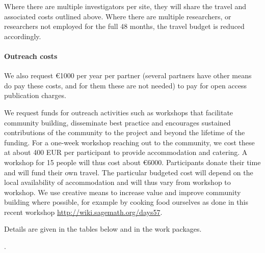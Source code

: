Where there are multiple investigators per site, they will share the
travel and associated costs outlined above. Where there are multiple
researchers, or researchers not employed for the full 48 months, the
travel budget is reduced accordingly.

\paragraph{Outreach costs}
\label{sect:budget-outreach-publication-charges}
We also request \euro{1000} per year per partner (several partners
have other means do pay these costs, and for them these are not needed) 
to pay for open access publication charges.

\label{sect:budget-outreach-workshops}
We request funds for outreach activities such as workshops that
facilitate community building, disseminate best practice and
encourages sustained contributions of the community to the project and
beyond the lifetime of the funding. For  a one-week workshop reaching
out to the community, we cost these at about 400 EUR per participant
to provide accommodation and catering. A workshop for 15 people will
thus cost about \euro{6000}. Participants donate their time and will fund
their own travel. The particular budgeted cost will depend on the
local availability of accommodation and will thus vary from workshop to
workshop. We use creative means to increase value and improve
community building where possible, for example by cooking food
ourselves as done in this recent workshop
\href{http://wiki.sagemath.org/days57}{http://wiki.sagemath.org/days57}.

Details are given in the tables below and in the work packages.


.




